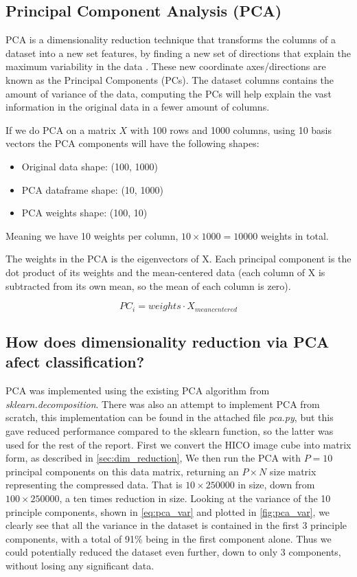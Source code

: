 \subsection{Principal Component Analysis (PCA)}

PCA is a dimensionality reduction technique that transforms the columns of a dataset 
into a new set features, by finding a new set of directions that explain the maximum 
variability in the data \cite{prabhakaran2019}. These new coordinate axes/directions 
are known as the Principal Components (PCs). The dataset columns contains the amount 
of variance of the data, computing the PCs will help explain the vast information in 
the original data in a fewer amount of columns. 

If we do PCA on a matrix $X$ with 100 rows and 1000 columns, using 10 basis vectors 
the PCA components will have the following shapes:

\begin{itemize}
    \item Original data shape:  (100, 1000)
    \item PCA dataframe shape:  (10, 1000)
    \item PCA weights shape:  (100, 10)
\end{itemize}

Meaning we have 10 weights per column, $10 \times 1000 = 10000$ weights in total. 

The weights in the PCA is the eigenvectors of X. Each principal component is the dot 
product of its weights and the mean-centered data (each column of X is subtracted from 
its own mean, so the mean of each column is zero). 

\begin{equation}
    PC_i = weights \cdot X_{meancentered}
\end{equation}


\subsection{How does dimensionality reduction via PCA afect classification?}

PCA was implemented using the existing PCA algorithm from \textit{sklearn.decomposition}. 
There was also an attempt to implement PCA from scratch, this implementation can be found in 
the attached file \textit{pca.py}, but this gave reduced performance compared to the sklearn 
function, so the latter was used for the rest of the report. 
First we convert the HICO image cube into matrix form, as described in \cref{sec:dim_reduction}, 
We then run the PCA with $P = 10$ principal components on this data matrix, returning 
an $P \times N$ size matrix representing the compressed data. That is $10 \times 250000$ in size, 
down from $100 \times 250000$, a ten times reduction in size. Looking at the variance 
of the 10 principle components, shown in \cref{eq:pca_var} and plotted in \cref{fig:pca_var}, we 
clearly see that all the variance in the dataset is contained in the first 3 principle components, 
with a total of 91\% being in the first component alone. 
Thus we could potentially reduced the dataset even further, down to only 3 components, without 
losing any significant data. 

